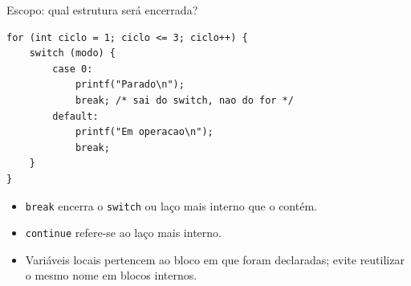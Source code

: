 \begin{frame}[fragile]{Escopo: qual estrutura será encerrada?}
\begin{lstlisting}
for (int ciclo = 1; ciclo <= 3; ciclo++) {
    switch (modo) {
        case 0:
            printf("Parado\n");
            break; /* sai do switch, nao do for */
        default:
            printf("Em operacao\n");
            break;
    }
}
\end{lstlisting}
\begin{itemize}
\item \texttt{break} encerra o \texttt{switch} ou laço mais interno que o contém.
\item \texttt{continue} refere-se ao laço mais interno.
\item Variáveis locais pertencem ao bloco em que foram declaradas; evite reutilizar o mesmo nome em blocos internos.
\end{itemize}
\end{frame}
